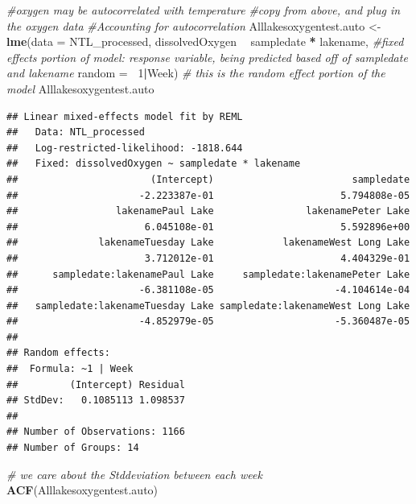 \documentclass[12pt,]{article}
\newenvironment{Shaded}{\begin{snugshade}}{\end{snugshade}}
\newcommand{\KeywordTok}[1]{\textcolor[rgb]{0.13,0.29,0.53}{\textbf{#1}}}
\newcommand{\DataTypeTok}[1]{\textcolor[rgb]{0.13,0.29,0.53}{#1}}
\newcommand{\DecValTok}[1]{\textcolor[rgb]{0.00,0.00,0.81}{#1}}
\newcommand{\StringTok}[1]{\textcolor[rgb]{0.31,0.60,0.02}{#1}}
\newcommand{\CommentTok}[1]{\textcolor[rgb]{0.56,0.35,0.01}{\textit{#1}}}
\newcommand{\OperatorTok}[1]{\textcolor[rgb]{0.81,0.36,0.00}{\textbf{#1}}}
\newcommand{\NormalTok}[1]{#1}
\begin{document}
\begin{Shaded}
\begin{Highlighting}[]
\CommentTok{#oxygen may be autocorrelated with temperature}
\CommentTok{#copy from above, and plug in the oxygen data}
\CommentTok{#Accounting for autocorrelation}
\NormalTok{Alllakesoxygentest.auto <-}\StringTok{ }\KeywordTok{lme}\NormalTok{(}\DataTypeTok{data =}\NormalTok{ NTL_processed, }
\NormalTok{                     dissolvedOxygen }\OperatorTok{~}\StringTok{ }\NormalTok{sampledate }\OperatorTok{*}\StringTok{ }\NormalTok{lakename, }\CommentTok{#fixed effects portion of model: response variable, being predicted based off of sampledate and lakename}
                     \DataTypeTok{random =} \OperatorTok{~}\DecValTok{1}\OperatorTok{|}\NormalTok{Week)  }\CommentTok{# this is the random effect portion of the model}
\NormalTok{Alllakesoxygentest.auto}
\end{Highlighting}
\end{Shaded}

\begin{verbatim}
## Linear mixed-effects model fit by REML
##   Data: NTL_processed 
##   Log-restricted-likelihood: -1818.644
##   Fixed: dissolvedOxygen ~ sampledate * lakename 
##                       (Intercept)                        sampledate 
##                     -2.223387e-01                      5.794808e-05 
##                 lakenamePaul Lake                lakenamePeter Lake 
##                      6.045108e-01                      5.592896e+00 
##              lakenameTuesday Lake            lakenameWest Long Lake 
##                      3.712012e-01                      4.404329e-01 
##      sampledate:lakenamePaul Lake     sampledate:lakenamePeter Lake 
##                     -6.381108e-05                     -4.104614e-04 
##   sampledate:lakenameTuesday Lake sampledate:lakenameWest Long Lake 
##                     -4.852979e-05                     -5.360487e-05 
## 
## Random effects:
##  Formula: ~1 | Week
##         (Intercept) Residual
## StdDev:   0.1085113 1.098537
## 
## Number of Observations: 1166
## Number of Groups: 14
\end{verbatim}

\begin{Shaded}
\begin{Highlighting}[]
\CommentTok{# we care about the Stddeviation between each week}
\KeywordTok{ACF}\NormalTok{(Alllakesoxygentest.auto)}
\end{Highlighting}
\end{Shaded}
\end{document}
